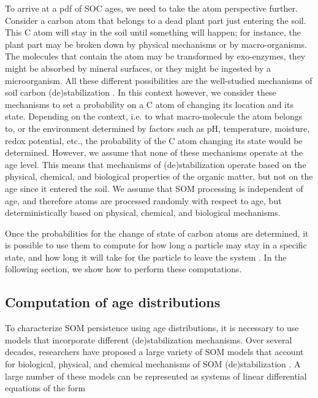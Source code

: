 \documentclass[draft,linenumbers]{agujournal}
\begin{document}
To arrive at a pdf of SOC ages, we need to take the atom perspective further. Consider a carbon atom that belongs to a dead plant part just entering the soil. This C atom will stay in the soil until something will happen; for instance, the plant part may be broken down by physical mechanisms or by macro-organisms. The molecules that contain the atom may be transformed by exo-enzymes, they might be absorbed by mineral surfaces, or they might be ingested by a microorganism. All these different possibilities are the well-studied mechanisms of soil carbon (de)stabilization \citep{Sollins1996, vonLutzow2008, Schmidt2011, LehmannKleber}. In this context however, we consider these mechanisms to set a probability on a C atom of changing its location and its state. Depending on the context, i.e. to what macro-molecule the atom belongs to, or the environment determined by factors such as pH, temperature, moisture, redox potential, etc., the probability of the C atom changing its state would be determined. However, we assume that none of these mechanisms operate at the age level. This means that mechanisms of (de)stabilization operate based on the physical, chemical, and biological properties of the organic matter, but not on the age since it entered the soil. We assume that SOM processing is independent of age, and therefore atoms are processed randomly with respect to age, but deterministically based on physical, chemical, and biological mechanisms. 

Once the probabilities for the change of state of carbon atoms are determined, it is possible to use them to compute for how long a particle may stay in a specific state, and how long it will take for the particle to leave the system \citep{Metzler2018MG}. In the following section, we show how to perform these computations. 

\subsection{Computation of age distributions}
To characterize SOM persistence using age distributions, it is necessary to use models that incorporate different (de)stabilization mechanisms. Over several decades, researchers have proposed a large variety of SOM models that account for biological, physical, and chemical mechanisms of SOM (de)stabilization \citep{Manzoni2009SBB}. A large number of these models can be represented as systems of linear differential equations \citep{Sierra2015EM} of the form
\end{document}
